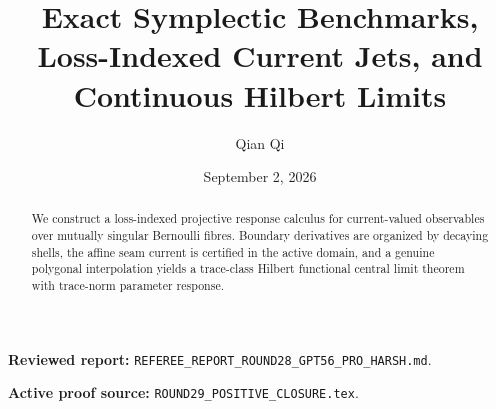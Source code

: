 \documentclass[11pt,reqno]{amsart}
\title[A1 Round 29 revision]{Exact Symplectic Benchmarks, Loss-Indexed Current Jets, and Continuous Hilbert Limits}
\author{Qian Qi}
\date{September 2, 2026}
\begin{document}
\begin{abstract}We construct a loss-indexed projective response calculus for current-valued observables over mutually singular Bernoulli fibres. Boundary derivatives are organized by decaying shells, the affine seam current is certified in the active domain, and a genuine polygonal interpolation yields a trace-class Hilbert functional central limit theorem with trace-norm parameter response.\end{abstract}
\maketitle
\noindent\textbf{Reviewed report:} \texttt{REFEREE\_REPORT\_ROUND28\_GPT56\_PRO\_HARSH.md}.\par
\noindent\textbf{Active proof source:} \texttt{ROUND29\_POSITIVE\_CLOSURE.tex}.\par

\end{document}
